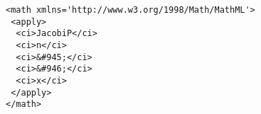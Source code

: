 \vspace{0.4cm}
\begin{lstlisting}[label={lst:mathematica},mathescape=true,caption=The content MathML for~(\ref{eq:jac-mat}) generated by Mathematica. We were using the \texttt{ExportString} command to produce the output.]
<math xmlns='http://www.w3.org/1998/Math/MathML'>
 <apply>
  <ci>JacobiP</ci>
  <ci>n</ci>
  <ci>&#945;</ci>
  <ci>&#946;</ci>
  <ci>x</ci>
 </apply>
</math>
\end{lstlisting}
